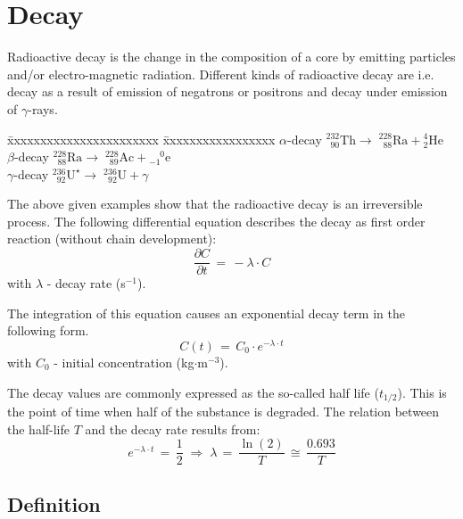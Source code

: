 \section{Decay}

Radioactive decay is the change in the composition of a core by emitting particles and/or electro-magnetic radiation. Different kinds of radioactive decay are i.e. decay as a result of emission of negatrons or positrons and decay under emission of $\gamma$-rays.

\begin{tabbing}
\=xxxxxxxxxxxxxxxxxxxxxxx \=xxxxxxxxxxxxxxxxx \kill
\> $\alpha$-decay
\> ${^{232}_{\phantom{2}90}}\mathrm{Th}\rightarrow\;{^{228}_{\phantom{2}88}}\mathrm{Ra}+{^{4}_{2}}\mathrm{He}$ \\[1.5ex]
\> $\beta$-decay
\> ${^{228}_{\phantom{2}88}}\mathrm{Ra}\rightarrow\;{^{228}_{\phantom{2}89}}\mathrm{Ac}+{^{\phantom{-}0}_{-1}}\mathrm{e}$ \\[1.5ex]
\> $\gamma$-decay
\> ${^{236}_{\phantom{2}92}}\mathrm{U}^{\star}\rightarrow\;{^{236}_{\phantom{2}92}}\mathrm{U}+\gamma$
\end{tabbing}

The above given examples show that the radioactive decay is an irreversible process. The following differential equation describes the decay as first order reaction (without chain development):
\begin{equation}
\frac{\partial C}{\partial t}\,=\,-\lambda\cdot C
\label{eq55}
\end{equation}
{\small
with $\lambda$ - decay rate (s$^{-1}$).
}

The integration of this equation causes an exponential decay term in the following form.
\begin{equation}
C(t)\,=\,C_0\cdot e^{-\lambda\cdot t}
\label{eq56}
\end{equation}
{\small
with $C_0$ - initial concentration (kg$\cdot$m$^{-3}$).
}

The decay values are commonly expressed as the so-called half life ($t_{1/2}$). This is the point of time when half of the substance is degraded. The relation between the half-life $T$ and the decay rate results from:
\begin{equation}
e^{-\lambda\cdot t}\,=\,\frac{1}{2}\;\Rightarrow\;
\lambda\,=\,\frac{\ln(2)}{T}\,\cong\,\frac{0.693}{T}
\label{eq57}
\end{equation}

\subsection{Definition}

